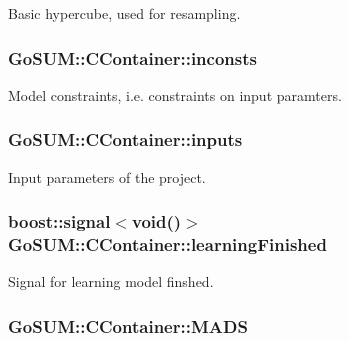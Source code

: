 Basic hypercube, used for resampling. 

\hypertarget{class_go_s_u_m_1_1_c_container_a73819357a0ef4d28c921ae3562a21246}{
\subsubsection[{inconsts}]{ Go\-S\-U\-M\-::\-C\-Container\-::inconsts\hspace{0.3cm}{\ttfamily [private]}}}\label{class_go_s_u_m_1_1_c_container_a73819357a0ef4d28c921ae3562a21246}


Model constraints, i.\-e. constraints on input paramters. 

\hypertarget{class_go_s_u_m_1_1_c_container_a0ca8dbcc826a7c66fb42a11b5b22e7b8}{
\subsubsection[{inputs}]{ Go\-S\-U\-M\-::\-C\-Container\-::inputs\hspace{0.3cm}{\ttfamily [private]}}}\label{class_go_s_u_m_1_1_c_container_a0ca8dbcc826a7c66fb42a11b5b22e7b8}


Input parameters of the project. 

\hypertarget{class_go_s_u_m_1_1_c_container_a9068a47de6aaaf67765f9e0ebd407e8a}{
\subsubsection[{learning\-Finished}]{\setlength{\rightskip}{0pt plus 5cm}boost\-::signal$<$void()$>$ Go\-S\-U\-M\-::\-C\-Container\-::learning\-Finished}}\label{class_go_s_u_m_1_1_c_container_a9068a47de6aaaf67765f9e0ebd407e8a}


Signal for learning model finshed. 

\hypertarget{class_go_s_u_m_1_1_c_container_a7b9a7fe1992a3483366952a19b1ee484}{
\subsubsection[{M\-A\-D\-S}]{ Go\-S\-U\-M\-::\-C\-Container\-::\-M\-A\-D\-S\hspace{0.3cm}{\ttfamily [private]}}}\label{class_go_s_u_m_1_1_c_container_a7b9a7fe1992a3483366952a19b1ee484}


